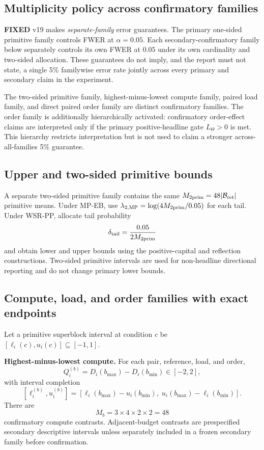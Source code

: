 \documentclass[11pt,a4paper]{article}
\newcommand{\FIXED}{\textbf{FIXED}}
\newcommand{\Bret}{\mathcal B_{\mathrm{ret}}}
\begin{document}
\subsection{Multiplicity policy across confirmatory families}\label{sec:multiplicity}
\FIXED{} v19 makes \emph{separate-family} error guarantees. The primary one-sided primitive family controls FWER at $\alpha=0.05$. Each secondary-confirmatory family below separately controls its own FWER at $0.05$ under its own cardinality and two-sided allocation. These guarantees do not imply, and the report must not state, a single 5\% familywise error rate jointly across every primary and secondary claim in the experiment.

The two-sided primitive family, highest-minus-lowest compute family, paired load family, and direct paired order family are distinct confirmatory families. The order family is additionally hierarchically activated: confirmatory order-effect claims are interpreted only if the primary positive-headline gate $L_\Theta>0$ is met. This hierarchy restricts interpretation but is not used to claim a stronger across-all-families 5\% guarantee.

\subsection{Upper and two-sided primitive bounds}
A separate two-sided primitive family contains the same $M_{\rm 2prim}=48|\Bret|$ primitive means. Under MP-EB, use $\lambda_{2,\rm MP}=\log(4M_{\rm 2prim}/0.05)$ for each tail. Under WSR-PP, allocate tail probability
\[
\delta_{\rm tail}=\frac{0.05}{2M_{\rm 2prim}}
\]
and obtain lower and upper bounds using the positive-capital and reflection constructions. Two-sided primitive intervals are used for non-headline directional reporting and do not change primary lower bounds.

\subsection{Compute, load, and order families with exact endpoints}\label{sec:secondarysupports}
Let a primitive superblock interval at condition $c$ be $[\ell_i(c),u_i(c)]\subseteq[-1,1]$.

\textbf{Highest-minus-lowest compute.} For each pair, reference, load, and order,
\[
Q_i^{(b)}=D_i(b_{\max})-D_i(b_{\min})\in[-2,2],
\]
with interval completion
\[
[\ell_i^{(b)},u_i^{(b)}]
=
[\ell_i(b_{\max})-u_i(b_{\min}),\;u_i(b_{\max})-\ell_i(b_{\min})].
\]
There are
\[
M_b=3\times4\times2\times2=48
\]
confirmatory compute contrasts. Adjacent-budget contrasts are prespecified secondary descriptive intervals unless separately included in a frozen secondary family before confirmation.
\end{document}
